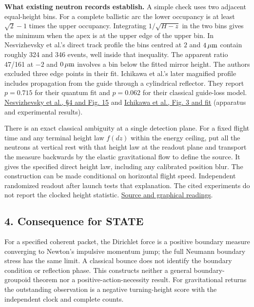 \documentclass[11pt,a4paper]{article}
\begin{document}
\textbf{What existing neutron records establish.} A simple check uses
two adjacent equal-height bins. For a complete ballistic arc the lower
occupancy is at least \(\sqrt2-1\) times the upper occupancy.
Integrating \(1/\sqrt{H-z}\) in the two bins gives the minimum when the
apex is at the upper edge of the upper bin. In Nesvizhevsky et al.'s
direct track profile the bins centred at \(2\) and \(4\,\mu{\rm m}\)
contain roughly 324 and 346 events, well inside that inequality. The
apparent ratio 47/161 at \(-2\) and \(0\,\mu{\rm m}\) involves a bin
below the fitted mirror height. The authors excluded three edge points
in their fit. Ichikawa et al.'s later magnified profile includes
propagation from the guide through a cylindrical reflector. They report
\(p=0.715\) for their quantum fit and \(p=0.062\) for their classical
guide-loss model.
\href{https://arxiv.org/pdf/hep-ph/0502081}{Nesvizhevsky et al., §4 and
Fig. 15} and \href{https://arxiv.org/pdf/1304.1660}{Ichikawa et al.,
Fig. 3 and fit} (apparatus and experimental results).

There is an exact classical ambiguity at a single detection plane. For a
fixed flight time and any terminal height law \(f(dz)\) within the
energy ceiling, put all the neutrons at vertical rest with that height
law at the readout plane and transport the measure backwards by the
elastic gravitational flow to define the source. It gives the specified
direct height law, including any calibrated position blur. The
construction can be made conditional on horizontal flight speed.
Independent randomized readout after launch tests that explanation. The
cited experiments do not report the clocked height statistic.
\href{../docs/NeutronGravity_HeightMeasurements.md}{Source and graphical
readings}.

\subsection{4. Consequence for STATE}\label{consequence-for-state}

For a specified coherent packet, the Dirichlet force is a positive
boundary measure converging to Newton's impulsive momentum jump; the
full Neumann boundary stress has the same limit. A classical bounce does
not identify the boundary condition or reflection phase. This constructs
neither a general boundary-groupoid theorem nor a
positive-action-necessity result. For gravitational returns the
outstanding observation is a negative turning-height score with the
independent clock and complete counts.
\end{document}
